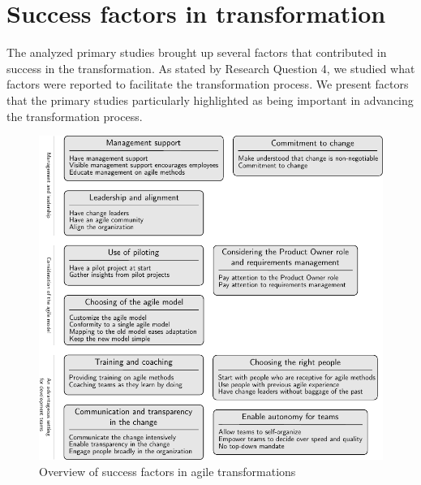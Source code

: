 


\clearpage

\section{Success factors in transformation}

The analyzed primary studies brought up several factors that contributed in
success in the transformation. As stated by Research Question 4, we studied what
factors were reported to facilitate the transformation process. We present
factors that the primary studies particularly highlighted as being important in
advancing the transformation process.

\begin{figure}[!b]
  \begin{center}
    \includegraphics[width=1\textwidth]{graphics/success_summary.pdf}
    \caption{Overview of success factors in agile transformations}
    \label{fig:success_summary}
  \end{center}
\end{figure}

